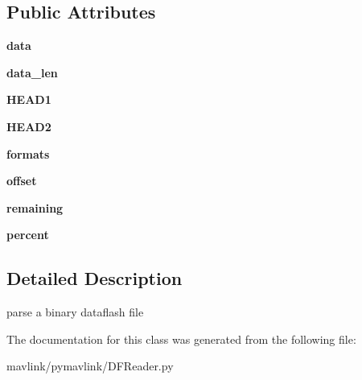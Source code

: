 \subsection*{Public Attributes}
\begin{DoxyCompactItemize}
\item 
\mbox{\label{classpymavlink_1_1DFReader_1_1DFReader__binary_a3b816525d2d54907d8f30b9fb8b5df30}} 
{\bfseries data}
\item 
\mbox{\label{classpymavlink_1_1DFReader_1_1DFReader__binary_a0ab35107f2964c2bf3c132f03f4b0c34}} 
{\bfseries data\+\_\+len}
\item 
\mbox{\label{classpymavlink_1_1DFReader_1_1DFReader__binary_ac47fb932eda0850aa88561052d44c055}} 
{\bfseries H\+E\+A\+D1}
\item 
\mbox{\label{classpymavlink_1_1DFReader_1_1DFReader__binary_a1fec06041f6333071877720afd96e8df}} 
{\bfseries H\+E\+A\+D2}
\item 
\mbox{\label{classpymavlink_1_1DFReader_1_1DFReader__binary_a69e3977c6dbba7ea747b620541b272ee}} 
{\bfseries formats}
\item 
\mbox{\label{classpymavlink_1_1DFReader_1_1DFReader__binary_abc21a7c5ba35c138513bdbe1701d2425}} 
{\bfseries offset}
\item 
\mbox{\label{classpymavlink_1_1DFReader_1_1DFReader__binary_a24e3115c0432ba83b22d4dba1ab46f29}} 
{\bfseries remaining}
\item 
\mbox{\label{classpymavlink_1_1DFReader_1_1DFReader__binary_a14b6477bdb0c30fad0dcc75099a87d4b}} 
{\bfseries percent}
\end{DoxyCompactItemize}


\subsection{Detailed Description}
\begin{DoxyVerb}parse a binary dataflash file\end{DoxyVerb}
 

The documentation for this class was generated from the following file\+:\begin{DoxyCompactItemize}
\item 
mavlink/pymavlink/D\+F\+Reader.\+py\end{DoxyCompactItemize}
